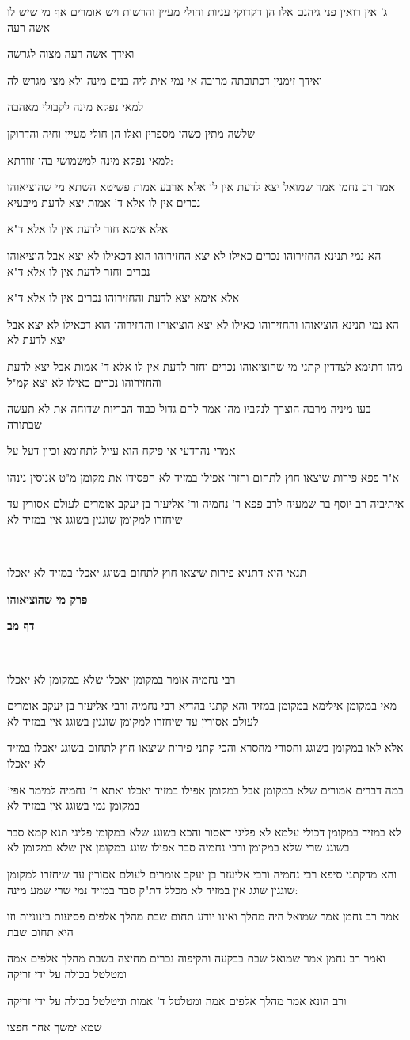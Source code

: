 \documentclass[12pt, openany]{book}
\newcommand{\sethebfont}{
\fontsize{10.5pt}{21.0pt} \selectfont
}
\newcommand{\textblock}[1]{
{\sethebfont #1\\}	
}
\newcommand{\chapname}{}
\newcommand{\sectname}{}
\newcommand{\newchap}[1]{
	\addcontentsline{toc}{chapter}{#1}
	\renewcommand{\chapname}{#1}
		\begin{center}
			\textbf{%
\fontsize{16pt}{16pt}\selectfont
				#1}
		\end{center}
}
\newcommand{\newsection}[1]{
	\addcontentsline{toc}{section}{#1}
	\renewcommand{\sectname}{#1}	
	\vspace{-\baselineskip}
	\begin{center}
		\textbf{%
\fontsize{16pt}{16pt}\selectfont
			#1}
	\end{center}
	\vspace{-\baselineskip}
	\nopagebreak
}
\begin{document}
\textblock{ג' אין רואין פני גיהנם אלו הן דקדוקי עניות וחולי מעיין והרשות ויש אומרים אף מי שיש לו אשה רעה}
\textblock{ואידך אשה רעה מצוה לגרשה}
\textblock{ואידך זימנין דכתובתה מרובה אי נמי אית ליה בנים מינה ולא מצי מגרש לה}
\textblock{למאי נפקא מינה לקבולי מאהבה}
\textblock{שלשה מתין כשהן מספרין ואלו הן חולי מעיין וחיה והדרוקן}
\textblock{למאי נפקא מינה למשמושי בהו זוודתא:}
\textblock{אמר רב נחמן אמר שמואל יצא לדעת אין לו אלא ארבע אמות פשיטא השתא מי שהוציאוהו נכרים אין לו אלא ד' אמות יצא לדעת מיבעיא}
\textblock{אלא אימא חזר לדעת אין לו אלא ד"א}
\textblock{הא נמי תנינא החזירוהו נכרים כאילו לא יצא החזירוהו הוא דכאילו לא יצא אבל הוציאוהו נכרים וחזר לדעת אין לו אלא ד"א}
\textblock{אלא אימא יצא לדעת והחזירוהו נכרים אין לו אלא ד"א}
\textblock{הא נמי תנינא הוציאוהו והחזירוהו כאילו לא יצא הוציאוהו והחזירוהו הוא דכאילו לא יצא אבל יצא לדעת לא}
\textblock{מהו דתימא לצדדין קתני מי שהוציאוהו נכרים וחזר לדעת אין לו אלא ד' אמות אבל יצא לדעת והחזירוהו נכרים כאילו לא יצא קמ"ל}
\textblock{בעו מיניה מרבה הוצרך לנקביו מהו אמר להם גדול כבוד הבריות שדוחה את לא תעשה שבתורה}
\textblock{אמרי נהרדעי אי פיקח הוא עייל לתחומא וכיון דעל על}
\textblock{א"ר פפא פירות שיצאו חוץ לתחום וחזרו אפילו במזיד לא הפסידו את מקומן מ"ט אנוסין נינהו}
\textblock{איתיביה רב יוסף בר שמעיה לרב פפא ר' נחמיה ור' אליעזר בן יעקב אומרים לעולם אסורין עד שיחזרו למקומן שוגגין בשוגג אין במזיד לא}
\textblock{}
\textblock{תנאי היא דתניא פירות שיצאו חוץ לתחום בשוגג יאכלו במזיד לא יאכלו}
\newchap{פרק \quad מי שהוציאוהו}
\newsection{דף מב}
\textblock{}
\textblock{רבי נחמיה אומר במקומן יאכלו שלא במקומן לא יאכלו}
\textblock{מאי במקומן אילימא במקומן במזיד והא קתני בהדיא רבי נחמיה ורבי אליעזר בן יעקב אומרים לעולם אסורין עד שיחזרו למקומן שוגגין בשוגג אין במזיד לא}
\textblock{אלא לאו במקומן בשוגג וחסורי מחסרא והכי קתני פירות שיצאו חוץ לתחום בשוגג יאכלו במזיד לא יאכלו}
\textblock{במה דברים אמורים שלא במקומן אבל במקומן אפילו במזיד יאכלו ואתא ר' נחמיה למימר אפי' במקומן נמי בשוגג אין במזיד לא}
\textblock{לא במזיד במקומן דכולי עלמא לא פליגי דאסור והכא בשוגג שלא במקומן פליגי תנא קמא סבר בשוגג שרי שלא במקומן ורבי נחמיה סבר אפילו שוגג במקומן אין שלא במקומן לא}
\textblock{והא מדקתני סיפא רבי נחמיה ורבי אליעזר בן יעקב אומרים לעולם אסורין עד שיחזרו למקומן שוגגין שוגג אין במזיד לא מכלל דת"ק סבר במזיד נמי שרי שמע מינה:}
\textblock{אמר רב נחמן אמר שמואל היה מהלך ואינו יודע תחום שבת מהלך אלפים פסיעות בינוניות וזו היא תחום שבת}
\textblock{ואמר רב נחמן אמר שמואל שבת בבקעה והקיפוה נכרים מחיצה בשבת מהלך אלפים אמה ומטלטל בכולה על ידי זריקה}
\textblock{ורב הונא אמר מהלך אלפים אמה ומטלטל ד' אמות וניטלטל בכולה על ידי זריקה}
\textblock{שמא ימשך אחר חפצו}
\end{document}
